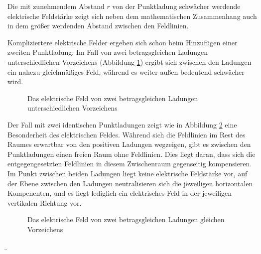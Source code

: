\begin{frame}
{	

		


	Die mit zunehmendem Abstand $r$ von der Punktladung schwächer werdende elektrische Feldstärke
	zeigt sich neben dem mathematischen Zusammenhang auch in dem größer werdenden Abstand zwischen den Feldlinien.


	Kompliziertere elektrische Felder ergeben sich schon beim Hinzufügen einer zweiten Punktladung. 
	Im Fall von zwei betragsgleichen Ladungen unterschiedlichen Vorzeichens 
	(Abbildung \ref{fig:anziehende_ladungen}) ergibt sich zwischen den Ladungen ein
	nahezu gleichmäßiges Feld, während es weiter außen bedeutend schwächer wird. 

	\begin{figure}[h!]
		\centering
		
		\caption{Das elektrische Feld von zwei betragsgleichen Ladungen unterschiedlichen Vorzeichens}
		\label{fig:anziehende_ladungen}
	\end{figure}

	Der Fall mit zwei identischen Punktladungen zeigt wie in Abbildung \ref{fig:abstoßendeladungen} eine Besonderheit des elektrischen Feldes. 
	Während sich die Feldlinien im Rest des Raumes erwartbar von den positiven Ladungen 
	wegzeigen, gibt es zwischen den Punktladungen einen freien Raum ohne Feldlinien.
	Dies liegt daran, dass sich die entgegengesetzten Feldlinien in diesem Zwischenraum gegenseitig kompensieren. 
	Im Punkt zwischen beiden Ladungen liegt keine elektrische Feldstärke vor, auf der Ebene zwischen den Ladungen
	neutralisieren sich die jeweiligen horizontalen Kompenenten, und es liegt lediglich ein elektrisches Feld in der jeweiligen 
	vertikalen Richtung vor.

	
	\begin{figure}[h!]
		\centering
		
		\caption{Das elektrische Feld von zwei betragsgleichen Ladungen gleichen Vorzeichens}
		\label{fig:abstoßendeladungen}
	\end{figure}

%

	\newpage

 	}
	
	\b{


	\begin{columns}
	   \begin{figure}[h!]
		\centering
		
	\end{figure}


\end{columns}}
\end{frame}
